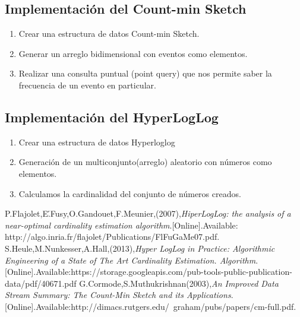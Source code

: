 \documentclass[journal]{IEEEtran}
\begin{document}
\subsection{Implementaci\'on del Count-min Sketch}

    \begin{enumerate}
	    \item
            Crear una estructura de datos Count-min Sketch.
	    \item
	    Generar un arreglo bidimensional con eventos como elementos.
	    \item
	    Realizar una consulta puntual (point query) que nos permite saber la frecuencia de un evento en particular.
	    
        \end{enumerate}

\subsection{Implementaci\'on del HyperLogLog}

     \begin{enumerate}
        \item
            Crear una estructura de datos Hyperloglog
	    \item
	    Generaci\'on de un multiconjunto(arreglo) aleatorio con n\'umeros como elementos. 
	    \item
	    Calculamos la cardinalidad del conjunto de n\'umeros creados.
        \end{enumerate}

\begin{thebibliography}{3}

 P.Flajolet,E\'.Fusy,O.Gandouet,F.Meunier,(2007),\textit{HiperLogLog: the analysis of a near-optimal cardinality estimation algorithm}.[Online].Available: http://algo.inria.fr/flajolet/Publications/FlFuGaMe07.pdf.
 S.Heule,M.Nunkesser,A.Hall,(2013),\textit{Hyper LogLog in Practice: Algorithmic Engineering of a State of The Art Cardinality Estimation. Algorithm}.[Online].Available:https://storage.googleapis.com/pub-tools-public-publication-data/pdf/40671.pdf
 G.Cormode,S.Muthukrishnan(2003),\textit{An Improved Data Stream Summary: The Count-Min Sketch and its Applications}.[Online].Available:http://dimacs.rutgers.edu/~graham/pubs/papers/cm-full.pdf.
\end{thebibliography}
\end{document}
